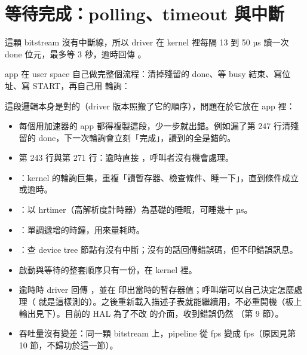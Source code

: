 \clearpage
\section{等待完成：polling、timeout 與中斷}
\label{sec:wait}

\begin{oneline}
這顆 bitstream 沒有中斷線，所以 driver 在 kernel 裡每隔 13 到 50 µs 讀一次 done 位元，最多等 3 秒，逾時回傳 。
\end{oneline}

\begin{before}
app 在 user space 自己做完整個流程：清掉殘留的 done、等 busy 結束、寫位址、寫 START，再自己用  輪詢：


這段邏輯本身是對的（driver 版本照搬了它的順序），問題在於它放在 app 裡：
\begin{itemize}
\item 每個用加速器的 app 都得複製這段，少一步就出錯。例如漏了第 247 行清殘留的 done，下一次輪詢會立刻「完成」，讀到的全是錯的。
\item 第 243 行與第 271 行：逾時直接 ，呼叫者沒有機會處理。
\end{itemize}
\end{before}

\begin{tech}
\begin{itemize}
\item {}：kernel 的輪詢巨集，重複「讀暫存器、檢查條件、睡一下」，直到條件成立或逾時。
\item {}：以 hrtimer（高解析度計時器）為基礎的睡眠，可睡幾十 µs。
\item {}：單調遞增的時鐘，用來量耗時。
\item {}：查 device tree 節點有沒有中斷；沒有的話回傳錯誤碼，但不印錯誤訊息。
\end{itemize}
\end{tech}

\begin{gain}
\begin{itemize}
\item 啟動與等待的整套順序只有一份，在 kernel 裡。
\item 逾時時 driver 回傳 ，並在  印出當時的暫存器值；呼叫端可以自己決定怎麼處理（ 就是這樣測的）。之後重新載入描述子表就能繼續用，不必重開機（板上輸出見下）。目前的 HAL 為了不改  的介面，收到錯誤仍然 （第 9 節）。
\item 吞吐量沒有變差：同一顆 bitstream 上，pipeline 從 \fpsUioMean{} fps 變成 \fpsDrvMean{} fps（原因見第 10 節，不歸功於這一節）。
\end{itemize}
\end{gain}

